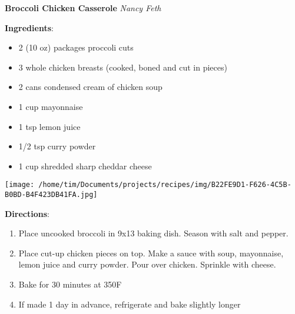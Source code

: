 \documentclass[11pt, twoside, openany]{book}
\begin{document}
\noindent\begin{minipage}[t]{\linewidth}%
{\Large\textbf{Broccoli Chicken Casserole}} \label{broccoli-chicken-casserole}\hfill\textit{Nancy Feth}\\
\noindent\begin{minipage}[t]{0.78\linewidth}%
\textbf{Ingredients}:\vspace{-3mm}
\begin{multicols}{2}
\begin{itemize}\setlength\itemsep{-1mm}
\item 2 (10 oz) packages proccoli cuts
\item 3 whole chicken breasts (cooked, boned and cut in pieces)
\item 2 cans condensed cream of chicken soup
\item 1 cup mayonnaise
\item 1 tsp lemon juice
\item 1/2 tsp curry powder
\item 1 cup shredded sharp cheddar cheese
\end{itemize}
\end{multicols}
\end{minipage}
\noindent\begin{minipage}[t]{0.18\linewidth}
\centering \strut\vspace*{-\baselineskip}\newline
\texttt{[image: /home/tim/Documents/projects/recipes/img/B22FE9D1-F626-4C5B-B0BD-B4F423DB41FA.jpg]}\\
\end{minipage}\vspace{3mm}
\textbf{Directions}:
\vspace{-3mm}\begin{enumerate}\setlength\itemsep{-1mm}
\item Place uncooked broccoli in 9x13 baking dish. Season with salt and pepper.
\item Place cut-up chicken pieces on top. Make a sauce with soup, mayonnaise, lemon juice and curry powder. Pour over chicken. Sprinkle with cheese.
\item Bake for 30 minutes at 350F
\item If made 1 day in advance, refrigerate and bake slightly longer
\end{enumerate}
\end{minipage}\vspace{8mm}
\end{document}
